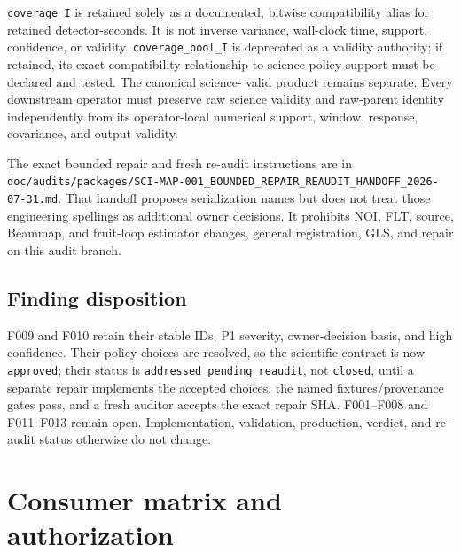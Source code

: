 \documentclass[11pt]{article}
\newcommand{\code}[1]{\nolinkurl{#1}}
\begin{document}
\code{coverage_I} is retained solely as a documented, bitwise compatibility
alias for retained detector-seconds.  It is not inverse variance, wall-clock
time, support, confidence, or validity.  \code{coverage_bool_I} is deprecated
as a validity authority; if retained, its exact compatibility relationship to
science-policy support must be declared and tested.  The canonical science-
valid product remains separate.  Every downstream operator must preserve raw
science validity and raw-parent identity independently from its operator-local
numerical support, window, response, covariance, and output validity.

{\raggedright The exact bounded repair and fresh re-audit instructions are in
\code{doc/audits/packages/SCI-MAP-001_BOUNDED_REPAIR_REAUDIT_HANDOFF_2026-07-31.md}.
That handoff proposes serialization names but does not treat those engineering
spellings as additional owner decisions.  It prohibits NOI, FLT, source,
Beammap, and fruit-loop estimator changes, general registration, GLS, and
repair on this audit branch.\par}

\subsection{Finding disposition}

{\raggedright F009 and F010 retain their stable IDs, P1 severity, owner-decision basis, and
high confidence.  Their policy choices are resolved, so the scientific
contract is now \texttt{approved}; their status is
\texttt{addressed\_pending\_reaudit}, not \texttt{closed}, until a separate
repair implements the accepted choices, the named fixtures/provenance gates
pass, and a fresh auditor accepts the exact repair SHA.  F001--F008 and
F011--F013 remain open.  Implementation, validation, production, verdict, and
re-audit status otherwise do not change.\par}

\section{Consumer matrix and authorization}
\end{document}
